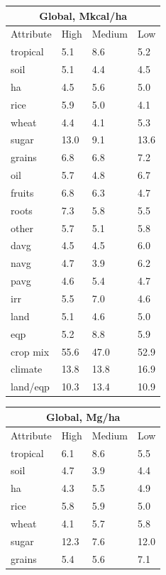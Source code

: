 \documentclass[12pt,twoside]{article}
\begin{document}
\begin{table}[h!]
\centering
\parbox{.45\linewidth} {
\begin{tabular}{llll}
\toprule
\multicolumn{4}{c}{\textbf{Global, Mkcal/ha}} \\
\midrule
Attribute & High & Medium & Low \\
\midrule
tropical & 5.1 & 8.6 & 5.2 \\
soil & 5.1 & 4.4 & 4.5 \\
ha & 4.5 & 5.6 & 5.0 \\
rice & 5.9 & 5.0 & 4.1 \\
wheat & 4.4 & 4.1 & 5.3 \\
sugar & 13.0 & 9.1 & 13.6 \\
grains & 6.8 & 6.8 & 7.2 \\
oil & 5.7 & 4.8 & 6.7 \\
fruits & 6.8 & 6.3 & 4.7 \\
roots & 7.3 & 5.8 & 5.5 \\
other & 5.7 & 5.1 & 5.8 \\
davg & 4.5 & 4.5 & 6.0 \\
navg & 4.7 & 3.9 & 6.2 \\
pavg & 4.6 & 5.4 & 4.7 \\
irr & 5.5 & 7.0 & 4.6 \\
land & 5.1 & 4.6 & 5.0 \\
eqp & 5.2 & 8.8 & 5.9 \\
\midrule
crop mix & 55.6 & 47.0 & 52.9 \\
climate & 13.8 & 13.8 & 16.9 \\
land/eqp & 10.3 & 13.4 & 10.9 \\
\bottomrule
\end{tabular}
\label{k.ny.wt_percentages}
}
\parbox{.45\linewidth} {
\centering
\begin{tabular}{llll}
\toprule
\multicolumn{4}{c}{\textbf{Global, Mg/ha}} \\
\midrule
Attribute & High & Medium & Low \\
\midrule
tropical & 6.1 & 8.6 & 5.5 \\
soil & 4.7 & 3.9 & 4.4 \\
ha & 4.3 & 5.5 & 4.9 \\
rice & 5.8 & 5.9 & 5.0 \\
wheat & 4.1 & 5.7 & 5.8 \\
sugar & 12.3 & 7.6 & 12.0 \\
grains & 5.4 & 5.6 & 7.1 \\

\end{tabular}}
\end{table}
\end{document}
